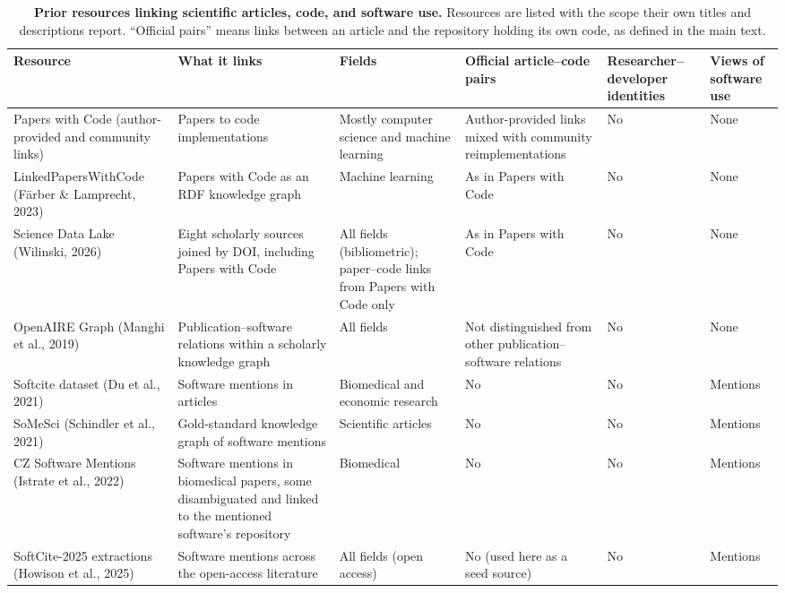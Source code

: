 \documentclass[pdflatex,sn-nature]{sn-jnl}%
\begin{document}
\begin{table}[p]
\caption{\textbf{Prior resources linking scientific articles, code, and software use.} Resources are listed with the scope their own titles and descriptions report. ``Official pairs'' means links between an article and the repository holding its own code, as defined in the main text.}\label{stab:prior}
\footnotesize
\setlength{\tabcolsep}{3pt}
\begin{tabular}{@{}>{\raggedright\arraybackslash}p{68pt}>{\raggedright\arraybackslash}p{80pt}>{\raggedright\arraybackslash}p{58pt}>{\raggedright\arraybackslash}p{60pt}>{\raggedright\arraybackslash}p{42pt}>{\raggedright\arraybackslash}p{34pt}@{}}
\toprule
Resource & What it links & Fields & Official article--code pairs & Researcher--developer identities & Views of software use \\
\midrule
Papers with Code (author-provided and community links) & Papers to code implementations & Mostly computer science and machine learning & Author-provided links mixed with community reimplementations & No & None \\
Linked\-Papers\-With\-Code (F\"{a}rber \& Lamprecht, 2023)~\cite{farber2023linked} & Papers with Code as an RDF knowledge graph & Machine learning & As in Papers with Code & No & None \\
Science Data Lake (Wilinski, 2026)~\cite{wilinski2026science} & Eight scholarly sources joined by DOI, including Papers with Code & All fields (bibliometric); paper--code links from Papers with Code only & As in Papers with Code & No & None \\
OpenAIRE Graph (Manghi et al., 2019)~\cite{manghi2019openaire} & Publication--software relations within a scholarly knowledge graph & All fields & Not distinguished from other publication--software relations & No & None \\
Softcite dataset (Du et al., 2021)~\cite{du2021softcite} & Software mentions in articles & Biomedical and economic research & No & No & Mentions \\
SoMeSci (Schindler et al., 2021)~\cite{schindler2021somesci} & Gold-standard knowledge graph of software mentions & Scientific articles & No & No & Mentions \\
CZ Software Mentions (Istrate et al., 2022)~\cite{istrate2022large} & Software mentions in biomedical papers, some disambiguated and linked to the mentioned software's repository & Biomedical & No & No & Mentions \\
SoftCite-2025 extractions (Howison et al., 2025)~\cite{howison_2025_15149379} & Software mentions across the open-access literature & All fields (open access) & No (used here as a seed source) & No & Mentions \\

\end{tabular}
\end{table}
\end{document}
